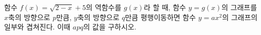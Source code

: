 함수 $f(x)=\sqrt{2-x}+5$의 역함수를 $g(x)$라 할 때, 함수 $y=g(x)$의 그래프를 $x$축의 방향으로 $p$만큼, $y$축의 방향으로 $q$만큼 평행이동하면 함수 $y=ax^2$의 그래프의 일부와 겹쳐진다. 이때 $apq$의 값을 구하시오. 
